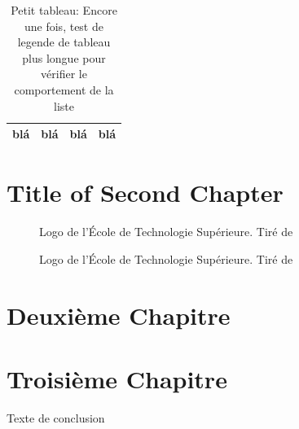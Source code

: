 \documentclass[letterpaper, twoside, 12pt,these,creativecommons,hyperref]{thETS}
\begin{document}
\begin{table}[ht]
	\caption{Petit tableau: Encore une fois, test de legende de tableau plus longue pour vérifier le comportement de la liste}
		\begin{tabular}{|c|c|c|c|}
		\hline
			blá & blá & blá & blá \\
			\hline
		\end{tabular}
	\label{tab:UnTableau}
\end{table}

\chapter{Title of Second Chapter}

\begin{figure}[ht]
	\centering
	\caption{Logo de l'École de Technologie Supérieure. \newline Tiré de \cite{ETS2010}}
\end{figure}

\begin{figure}[ht]
	\centering
	\caption{Logo de l'École de Technologie Supérieure. \newline Tiré de \cite{ETS2010}}
\end{figure}



\chapter{Deuxième Chapitre}

\chapter{Troisième Chapitre}

\begin{conclusion}
Texte de conclusion

\end{conclusion}


\appendix
\end{document}
